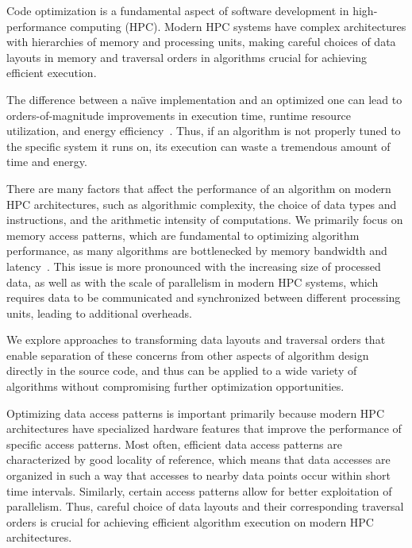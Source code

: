 \label{chap:introduction}

Code optimization is a fundamental aspect of software development in high-performance computing (HPC). Modern HPC systems have complex architectures with hierarchies of memory and processing units, making careful choices of data layouts in memory and traversal orders in algorithms crucial for achieving efficient execution.

The difference between a na\"{\i}ve implementation and an optimized one can lead to orders-of-magnitude improvements in execution time, runtime resource utilization, and energy efficiency~\cite{hennessy2019computer,drepper2007every}. Thus, if an algorithm is not properly tuned to the specific system it runs on, its execution can waste a tremendous amount of time and energy.

There are many factors that affect the performance of an algorithm on modern HPC architectures, such as algorithmic complexity, the choice of data types and instructions, and the arithmetic intensity of computations. We primarily focus on memory access patterns, which are fundamental to optimizing algorithm performance, as many algorithms are bottlenecked by memory bandwidth and latency~\cite{hennessy2019computer,drepper2007every}. This issue is more pronounced with the increasing size of processed data, as well as with the scale of parallelism in modern HPC systems, which requires data to be communicated and synchronized between different processing units, leading to additional overheads.

We explore approaches to transforming data layouts and traversal orders that enable separation of these concerns from other aspects of algorithm design directly in the source code, and thus can be applied to a wide variety of algorithms without compromising further optimization opportunities.

Optimizing data access patterns is important primarily because modern HPC architectures have specialized hardware features that improve the performance of specific access patterns.
Most often, efficient data access patterns are characterized by good locality of reference, which means that data accesses are organized in such a way that accesses to nearby data points occur within short time intervals. Similarly, certain access patterns allow for better exploitation of parallelism. Thus, careful choice of data layouts and their corresponding traversal orders is crucial for achieving efficient algorithm execution on modern HPC architectures.

